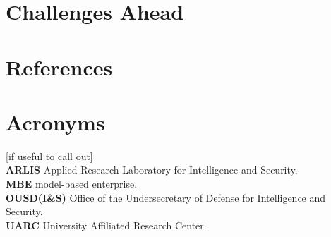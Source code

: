 \documentclass[letterpaper, 10pt]{article}
\begin{document}
\begin{multicols}{2}
    \section{Challenges Ahead}
        \lipsum[9]
    \section{References}
        \printbibliography[heading=none]

    \section{Acronyms}
        [if useful to call out] \\
        \textbf{ARLIS} Applied Research Laboratory for Intelligence and Security.\\ 
        \textbf{MBE} model-based enterprise. \\
        \textbf{OUSD(I\&S)} Office of the Undersecretary of Defense for  Intelligence and Security. \\
        \textbf{UARC} University Affiliated Research Center.\\
    \end{multicols}
    \newpage
\end{document}
